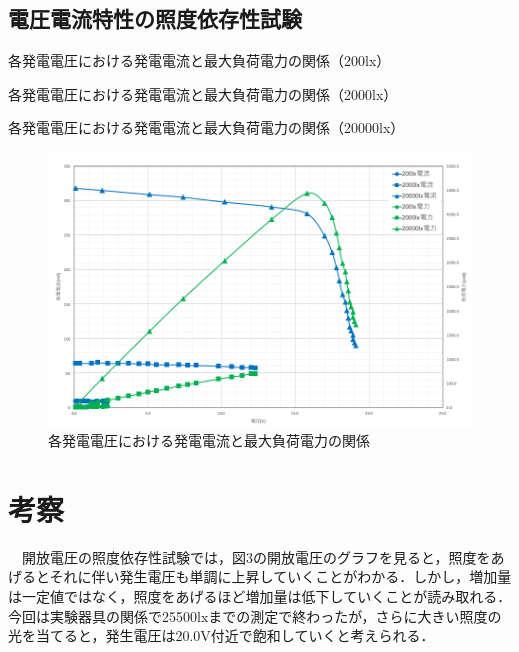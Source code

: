 \subsection{電圧電流特性の照度依存性試験}
\begin{table}[H]
  \small
  \centering
  \caption{各発電電圧における発電電流と最大負荷電力の関係（200lx）}
  
\end{table}

\begin{table}[H]
  \small
  \centering
  \caption{各発電電圧における発電電流と最大負荷電力の関係（2000lx）}
  
\end{table}

\begin{table}[H]
  \small
  \centering
  \caption{各発電電圧における発電電流と最大負荷電力の関係（20000lx）}
  
\end{table}

\begin{figure}[H]
  \centering
  \includegraphics[width=15cm]{./fig/fig05.png}
  \caption{各発電電圧における発電電流と最大負荷電力の関係}
\end{figure}

\newpage
\section{考察}
　開放電圧の照度依存性試験では，図3の開放電圧のグラフを見ると，照度をあげるとそれに伴い発生電圧も単調に上昇していくことがわかる．しかし，増加量は一定値ではなく，照度をあげるほど増加量は低下していくことが読み取れる．今回は実験器具の関係で25500lxまでの測定で終わったが，さらに大きい照度の光を当てると，発生電圧は20.0V付近で飽和していくと考えられる．\\

